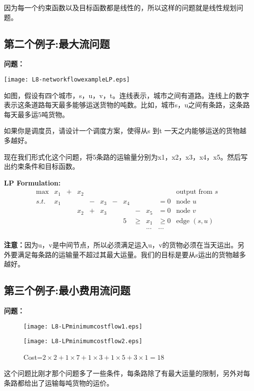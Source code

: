 因为每一个约束函数以及目标函数都是线性的，所以这样的问题就是线性规划问题。

\subsection{第二个例子:最大流问题}

\textbf{问题：}
\begin{center}
	\texttt{[image: L8-networkflowexampleLP.eps]}
\end{center}


如图，假设有四个城市，s，u，v，t。连线表示，城市之间有道路。连线上的数字表示这条道路每天最多能够运送货物的吨数。比如，城市s，u之间有条路，这条路每天最多运5吨货物。

如果你是调度员，请设计一个调度方案，使得从s 到t 一天之内能够运送的货物越多越好。

现在我们形式化这个问题，将5条路的运输量分别为x1，x2，x3，x4，x5。然后写出约束条件和目标函数。

\textbf{LP Formulation:}
\[
\begin{array}{rrrrrrrrrrlr}
 \max & x_1 &+&  x_2 & &     & &     & &       & & \text{output from  } s\\
 s.t. & x_1 & &      &-& x_3 &-& x_4 & &       & = 0 & \text{node } u \\
      &     & &  x_2 &+& x_3 & &     &-&  x_5  & = 0 & \text{node } v  \\
      &     & &      & &     & &  5   &\geq &  x_1  &\geq 0 & \text{edge }  (s, u)\\
      &     & &      & &     & &     & &  ...  & ... & \\
\end{array} \nonumber
\]

\textbf{注意：}因为u，v是中间节点，所以必须满足运入u，v的货物必须在当天运出。另外要满足每条路的运输量不超过其最大运量。我们的目标是要从s运出的货物越多越好。

\subsection{第三个例子:最小费用流问题}

\textbf{问题：}
\newpage
\begin{figure}
   \begin{center}%
     \begin{minipage}{0.4\textwidth}%
     \texttt{[image: L8-LPminimumcostflow1.eps]}%
     \end{minipage}%
     \quad
     \begin{minipage}{0.4\textwidth}
     \texttt{[image: L8-LPminimumcostflow2.eps]}%
     \end{minipage}%
     \caption{Cost=$2\times 2 + 1\times 7 + 1\times 3 + 1\times 5 + 3\times 1 = 18$ }
   \end{center}
 \end{figure}
这个问题比刚才那个问题多了一些条件，每条路除了有最大运量的限制，另外对每条路都给出了运输每吨货物的运价。

